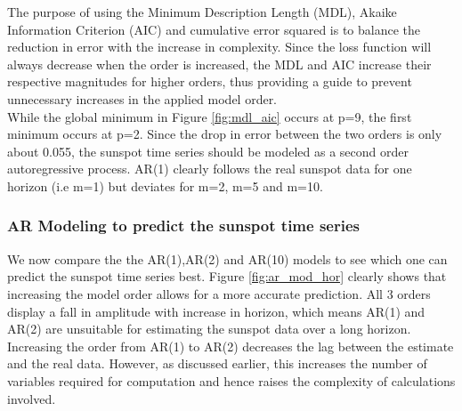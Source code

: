 The purpose of using the Minimum Description Length (MDL), Akaike Information Criterion (AIC) and cumulative error squared is to balance the reduction in error with the increase in complexity. Since the loss function will always decrease when the order is increased, the MDL and AIC increase their respective magnitudes for higher orders, thus providing a guide to prevent unnecessary increases in the applied model order.\\

While the global minimum in Figure \ref{fig:mdl_aic} occurs at p=9, the first minimum occurs at p=2. Since the drop in error between the two orders is only about 0.055, the sunspot time series should be modeled as a second order autoregressive process. AR(1) clearly follows the real sunspot data for one horizon (i.e m=1) but deviates for m=2, m=5 and m=10.

\pagebreak

\subsubsection{AR Modeling to predict the sunspot time series}

We now compare the the AR(1),AR(2) and AR(10) models to see which one can predict the sunspot time series best. Figure \ref{fig:ar_mod_hor} clearly shows that increasing the model order allows for a more accurate prediction. All 3 orders display a fall in amplitude with increase in horizon, which means AR(1) and AR(2) are unsuitable for estimating the sunspot data over a long horizon. Increasing the order from AR(1) to AR(2) decreases the lag between the estimate and the real data. However, as discussed earlier, this increases the number of variables required for computation and hence raises the complexity of calculations involved.


